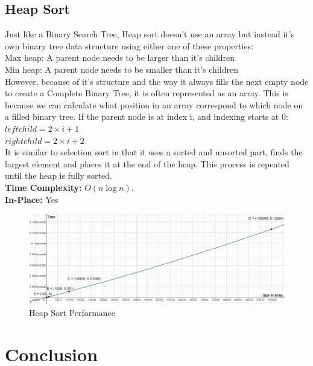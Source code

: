 \documentclass{article}
\begin{document}
\subsection{Heap Sort}

Just like a Binary Search Tree, Heap sort doesn't use an array but instead it's own binary tree data structure using either one of these properties:
\\Max heap: A parent node needs to be larger than it's children
\\Min heap: A parent node needs to be smaller than it's children
\\However, because of it's structure and the way it always fills the next empty node to create a Complete Binary Tree, it is often represented as an array. This is because we can calculate what position in an array correspond to which node on a filled binary tree. If the parent node is at index i, and indexing starts at 0:
\\$left child = 2 \times i + 1$
\\$right child = 2 \times i + 2$
\\It is similar to selection sort in that it uses a sorted and unsorted part, finds the largest element and places it at the end of the heap. This process is repeated until the heap is fully sorted.
\\
\textbf{Time Complexity:} $O(n\log n)$.
\\\textbf{In-Place:} Yes

\begin{figure}[h]
	\centering
	\includegraphics[width=1\linewidth]{"images/Heap Sort"}
	\caption{Heap Sort Performance}
	\label{fig:heap-sort}
\end{figure}

\newpage
\section{Conclusion}
\end{document}
